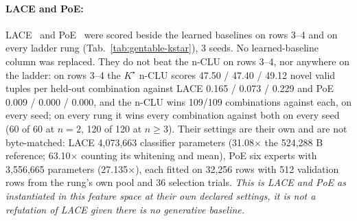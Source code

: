 \documentclass{article} %
\newcommand{\Kstar}{\ensuremath{K^{\star}}}
\begin{document}
\paragraph{LACE and PoE:}
LACE~\citep{nie_controllable_2021} and PoE~\citep{hinton_training_2002} were scored beside the
learned baselines on rows 3--4 and on every ladder rung (Tab.~\ref{tab:gentable-kstar}), 3 seeds. No
learned-baseline column was replaced. They do not beat the
n-CLU on rows 3--4, nor anywhere on the ladder: on rows 3--4 the $\Kstar$ n-CLU scores 47.50 / %
47.40 / 49.12 novel valid tuples per held-out combination against LACE 0.165 / 0.073 / 0.229 and PoE 0.009 / %
0.000 / 0.000, and the n-CLU wins 109/109 combinations against each, on every seed; on every rung it %
wins every combination against both on every seed (60 of 60 at $n=2$, 120 of 120 at $n\ge3$). %
Their settings are their own and are not byte-matched: LACE 4,073,663 classifier parameters %
(31.08$\times$ the 524,288 B reference; 63.10$\times$ counting its whitening and mean), PoE six %
experts with 3,556,665 parameters (27.135$\times$), each fitted on 32,256 rows with 512 validation %
rows from the rung's own pool and 36 selection trials. %
\emph{This is LACE and PoE as instantiated in this feature space at their own declared settings, it is not a refutation of LACE given there is no generative baseline.}
\end{document}
